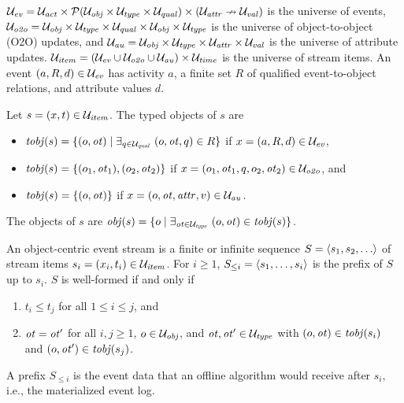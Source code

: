 \begin{definition}
\label{def:item}
$\mathcal{U}_{\mathit{ev}} = \mathcal{U}_{\mathit{act}} \times \mathcal{P}(\mathcal{U}_{\mathit{obj}} \times \mathcal{U}_{\mathit{type}} \times \mathcal{U}_{\mathit{qual}}) \times
(\mathcal{U}_{\mathit{attr}} \nrightarrow \mathcal{U}_{\mathit{val}})$ is the universe of events,
$\mathcal{U}_{\mathit{o2o}} = \mathcal{U}_{\mathit{obj}} \times \mathcal{U}_{\mathit{type}} \times \mathcal{U}_{\mathit{qual}} \times \mathcal{U}_{\mathit{obj}} \times \mathcal{U}_{\mathit{type}}$ is the
universe of object-to-object (O2O) updates, and
$\mathcal{U}_{\mathit{au}} = \mathcal{U}_{\mathit{obj}} \times \mathcal{U}_{\mathit{type}} \times \mathcal{U}_{\mathit{attr}} \times \mathcal{U}_{\mathit{val}}$ is the universe of
attribute updates.
$\mathcal{U}_{\mathit{item}} = (\mathcal{U}_{\mathit{ev}} \cup \mathcal{U}_{\mathit{o2o}} \cup \mathcal{U}_{\mathit{au}}) \times \mathcal{U}_{\mathit{time}}$ is the universe of
stream items.
An event $(a, R, d) \in \mathcal{U}_{\mathit{ev}}$ has activity $a$, a finite set $R$ of
qualified event-to-object relations, and attribute values $d$.

Let $s = (x, t) \in \mathcal{U}_{\mathit{item}}$.
The typed objects of $s$ are
\begin{itemize}
  \item $\mathit{tobj}(s) = \{(o, \mathit{ot}) \mid \exists_{q \in \mathcal{U}_{\mathit{qual}}}\
        (o, \mathit{ot}, q) \in R\}$ if $x = (a, R, d) \in \mathcal{U}_{\mathit{ev}}$,
  \item $\mathit{tobj}(s) = \{(o_1, \mathit{ot}_1), (o_2, \mathit{ot}_2)\}$ if
        $x = (o_1, \mathit{ot}_1, q, o_2, \mathit{ot}_2) \in \mathcal{U}_{\mathit{o2o}}$, and
  \item $\mathit{tobj}(s) = \{(o, \mathit{ot})\}$ if
        $x = (o, \mathit{ot}, \mathit{attr}, v) \in \mathcal{U}_{\mathit{au}}$.
\end{itemize}
The objects of $s$ are
$\mathit{obj}(s) = \{o \mid \exists_{\mathit{ot} \in \mathcal{U}_{\mathit{type}}}\ (o, \mathit{ot}) \in
\mathit{tobj}(s)\}$.
\end{definition}

\begin{definition}
\label{def:stream}
An object-centric event stream is a finite or infinite sequence
$S = \la s_1, s_2, \dots \ra$ of stream items $s_i = (x_i, t_i) \in \mathcal{U}_{\mathit{item}}$.
For $i \ge 1$, $S_{\le i} = \langle s_1, \dots, s_i \rangle$ is the prefix of $S$
up to $s_i$.
$S$ is well-formed if and only if
\begin{enumerate}
  \item[(i)] $t_i \le t_j$ for all $1 \le i \le j$, and
  \item[(ii)] $\mathit{ot} = \mathit{ot}'$ for all $i, j \ge 1$, $o \in \mathcal{U}_{\mathit{obj}}$, and
        $\mathit{ot}, \mathit{ot}' \in \mathcal{U}_{\mathit{type}}$ with $(o, \mathit{ot}) \in \mathit{tobj}(s_i)$
        and $(o, \mathit{ot}') \in \mathit{tobj}(s_j)$.
\end{enumerate}
\end{definition}

A prefix $S_{\le i}$ is the event data that an offline algorithm would
receive after $s_i$, i.e., the materialized event log.

